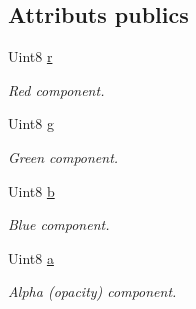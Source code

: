 \subsection*{Attributs publics}
\begin{DoxyCompactItemize}
\item 
\mbox{\label{classsf_1_1Color_a6a5256ca24a4f9f0e0808f6fc23e01e1}} 
Uint8 \hyperlink{classsf_1_1Color_a6a5256ca24a4f9f0e0808f6fc23e01e1}{r}
\begin{DoxyCompactList}\small\item\em Red component. \end{DoxyCompactList}\item 
\mbox{\label{classsf_1_1Color_a591daf9c3c55dea830c76c962d6ba1a5}} 
Uint8 \hyperlink{classsf_1_1Color_a591daf9c3c55dea830c76c962d6ba1a5}{g}
\begin{DoxyCompactList}\small\item\em Green component. \end{DoxyCompactList}\item 
\mbox{\label{classsf_1_1Color_a6707aedd0609c8920e12df5d7abc53cb}} 
Uint8 \hyperlink{classsf_1_1Color_a6707aedd0609c8920e12df5d7abc53cb}{b}
\begin{DoxyCompactList}\small\item\em Blue component. \end{DoxyCompactList}\item 
\mbox{\label{classsf_1_1Color_a56dbdb47d5f040d9b78ac6a0b8b3a831}} 
Uint8 \hyperlink{classsf_1_1Color_a56dbdb47d5f040d9b78ac6a0b8b3a831}{a}
\begin{DoxyCompactList}\small\item\em Alpha (opacity) component. \end{DoxyCompactList}\end{DoxyCompactItemize}
